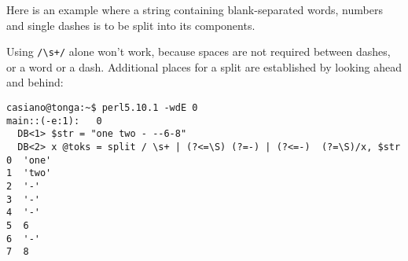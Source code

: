 \begin{it}

Here is an example where a string containing blank-separated words,
numbers and single dashes is to be split into its components. 

Using \verb#/\s+/#
alone won't work, because spaces are not required between dashes, or a
word or a dash. Additional places for a split are established by looking
ahead and behind:
\begin{verbatim}
casiano@tonga:~$ perl5.10.1 -wdE 0
main::(-e:1):   0
  DB<1> $str = "one two - --6-8"
  DB<2> x @toks = split / \s+ | (?<=\S) (?=-) | (?<=-)  (?=\S)/x, $str
0  'one'
1  'two'
2  '-'
3  '-'
4  '-'
5  6
6  '-'
7  8
\end{verbatim}
\end{it}


